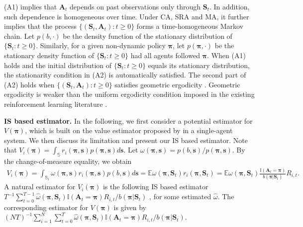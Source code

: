 \documentclass{article}
\newcommand{\Mean}{{\mathbb{E}}}
\begin{document}
(A1) implies that $\bm{A}_{t}$ depends on past observations only through $\bm{S}_{t}$. In addition, such dependence is homogeneous over time. Under CA, SRA and MA, it further implies that the process $\{(\bm{S}_t,\bm{A}_t):t\ge 0\}$ forms a time-homogeneous Markov chain. Let $p(b,\cdot)$ be the density function of the stationary distribution of $\{\bm{S}_t:t\ge 0\}$. Similarly, for a given non-dynamic policy $\bm{\pi}$, let $p(\bm{\pi},\cdot)$ be the stationary density function of $\{\bm{S}_{t}:t\ge 0\}$ had all agents followed $\bm{\pi}$. When (A1) holds and the initial distribution of $\{\bm{S}_t:t\ge 0\}$ equals its stationary distribution, the stationarity condition in (A2) is automatically satisfied. The second part of (A2) holds when $\{(\bm{S}_t,\bm{A}_t):t\ge 0\}$ satisfies geometric ergodicity \citep[see Theorem 3.7 of][]{Bradley2005}.  Geometric ergodicity
is weaker than the uniform ergodicity condition imposed in the existing reinforcement learning literature \citep{bhattacharya2019causal,zou2019}.


\textbf{IS based estimator.} In the following, we first consider a potential estimator for $V(\bm{\pi})$, which is built on the value estimator proposed by \cite{liu2018} in a single-agent system. We then discuss its limitation and present our IS based estimator. Note that $V_i(\bm{\pi})=\int_{\mathbb{S}} r_i(\bm{\pi},\bm{s})p(\bm{\pi},\bm{s})d\bm{s}$. Let $\omega(\bm{\pi},\bm{s})=p(b,\bm{s})/p(\bm{\pi},\bm{s})$. By the change-of-measure equality, we obtain
\vspace*{-0.1cm}
\begin{eqnarray}\label{eqn:valueliu2018}
	V_i(\bm{\pi})=\int_{\mathbb{S}_i} \omega(\bm{\pi},\bm{s})r_i(\bm{\pi},\bm{s})p(b,\bm{s})d\bm{s}=\Mean \omega(\bm{\pi}, \bm{S}_t) r_i(\bm{\pi},\bm{S}_t) 
	=\Mean \omega(\bm{\pi}, \bm{S}_t) \frac{\mathbb{I}(\bm{A}_t=\bm{\pi})}{b(\bm{\pi}|\bm{S}_t)} R_{i,t}.	
\end{eqnarray}
A natural estimator for $V_i(\bm{\pi})$ is the following IS based estimator
	$T^{-1}\sum_{t=0}^{T-1} \widehat{\omega}(\bm{\pi}, \bm{S}_{t}) \mathbb{I}(\bm{A}_t=\bm{\pi})R_{i,t}/b(\bm{\pi}|\bm{S}_t)$ ,
for some estimated $\widehat{\omega}$. The corresponding estimator for $V(\bm{\pi})$ is given by $(NT)^{-1} \sum_{i=1}^N \sum_{t=0}^{T} \widehat{\omega}(\bm{\pi}, \bm{S}_{t}) \mathbb{I}(\bm{A}_t=\bm{\pi})R_{i,t}/b(\bm{\pi}|\bm{S}_t)$. %
\end{document}
